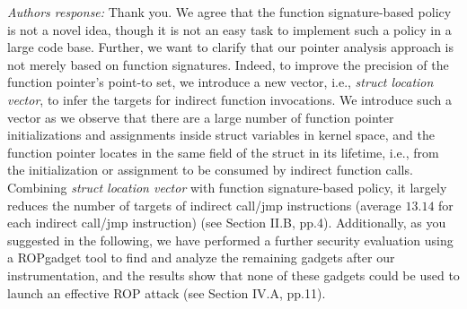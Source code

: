 \documentclass[oneside, 11pt]{article}
\begin{document}
{\em Authors response:}
Thank you. We agree that the function signature-based policy is not
a novel idea, though it is not an easy task to implement
such a policy in a large code base.
Further, we want to clarify that our pointer analysis
approach is not merely based on function signatures. Indeed, to improve
the precision of the function pointer's point-to set, we introduce a new
vector, i.e., \emph{struct location vector}, to infer the targets for
indirect function invocations. We introduce such a vector as we observe
that there are a large number of function pointer initializations and assignments inside
struct variables in kernel space, and the function pointer
locates in the same field of the struct in its lifetime, i.e.,
from the initialization or assignment to be consumed by indirect function calls.
Combining \emph{struct location vector} with function signature-based policy,
it largely reduces the number of targets of indirect call/jmp instructions
(average $13.14$ for each indirect call/jmp instruction) (see Section II.B, pp.4).
Additionally, as you suggested in the following, we have
performed a further security evaluation using a ROPgadget tool to find and analyze
the remaining gadgets after our instrumentation, and the results show that none of these gadgets could
be used to launch an effective ROP attack (see Section IV.A, pp.11).




\smallskip
\smallskip
\smallskip
{}
\end{document}
